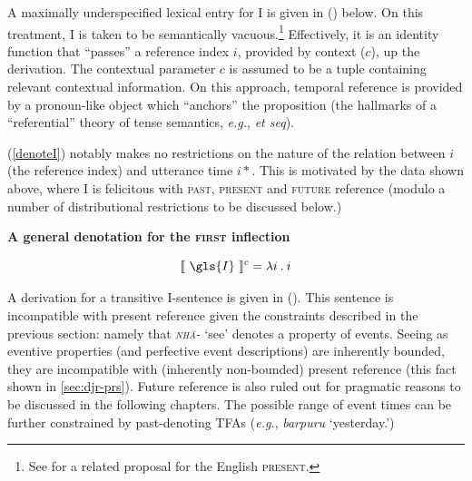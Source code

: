 A maximally underspecified lexical entry for \gls{I} is given in (\nextx) below. %
On this treatment, \gls{I} is taken to be semantically vacuous.\footnote{See \citet{Sauerland2002} for a related proposal for the English \textsc{present}.} Effectively, it is an identity function that ``passes'' a reference index $ i $, provided by context ($ c $), up the derivation. The contextual parameter $ c $ is assumed to be a tuple containing relevant contextual information. On this approach, temporal reference is provided by a pronoun-like object which ``anchors'' the proposition (the hallmarks of a ``referential'' theory of tense semantics, \textit{e.g.}, \citet{Kratzer1998} \textit{et seq}).

(\ref{denoteI}) notably makes no restrictions on the nature of the relation between $ i $ (the reference index) and utterance time $ i* $. This is motivated by the data shown above, where \gls{I} is felicitous with \textsc{past, present} and \textsc{future} reference (modulo a number of distributional restrictions to be discussed below.)

\begin{shaded}
\pex\textbf{A general denotation for the \textsc{first} inflection}
\label{denoteI}

\[ \denote[c]{~\gls{I}~}=\lambda i\mathbin.i \]
\xe

\end{shaded}

A derivation for a transitive \gls{I}-sentence is given in (\nextx). This sentence is incompatible with present reference given the constraints described in the previous section: namely that \textit{\textsc{nhä-}} `see' denotes a property of events. Seeing as eventive properties (and perfective event descriptions) are inherently bounded, they are incompatible with (inherently non-bounded) present reference (this fact shown in  \ref{sec:djr-prs}). Future reference is also ruled out for pragmatic reasons to be discussed in the following chapters.
The possible range of event times can be further constrained by past-denoting TFAs (\textit{e.g.}, \textit{barpuru} `yesterday.')

